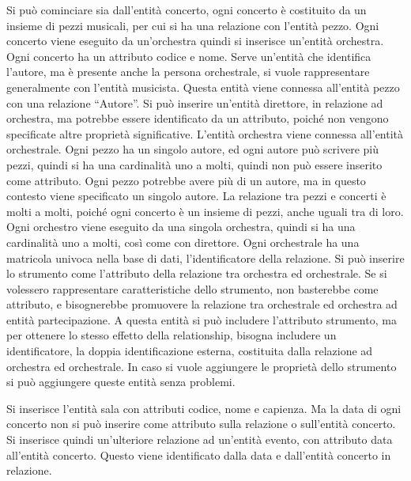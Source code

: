 \documentclass{article}
\numberwithin{equation}{subsection}
\begin{document}
Si può cominciare sia dall'entità concerto, ogni concerto è costituito da un insieme di pezzi musicali, per cui si ha una relazione con l'entità 
pezzo. Ogni concerto viene eseguito da un'orchestra quindi si inserisce un'entità orchestra. Ogni concerto ha un attributo codice e nome. 
Serve un'entità che identifica l'autore, ma è presente anche la persona orchestrale, si vuole rappresentare generalmente con l'entità musicista. Questa entità viene 
connessa all'entità pezzo con una relazione ``Autore''. Si può inserire un'entità direttore, in relazione ad orchestra, ma potrebbe essere 
identificato da un attributo, poiché non vengono specificate altre proprietà significative. L'entità orchestra viene connessa all'entità orchestrale. 
Ogni pezzo ha un singolo autore, ed ogni autore può scrivere più pezzi, quindi si ha una cardinalità uno a molti, quindi non può essere 
inserito come attributo. Ogni pezzo potrebbe avere più di un autore, ma in questo contesto viene specificato un singolo autore. La relazione tra 
pezzi e concerti è molti a molti, poiché ogni concerto è un insieme di pezzi, anche uguali tra di loro. 
Ogni orchestro viene eseguito da una singola orchestra, quindi si ha una cardinalità uno a molti, così come con direttore. 
Ogni orchestrale ha una matricola univoca nella base di dati, l'identificatore della relazione. Si può inserire lo strumento come l'attributo della 
relazione tra orchestra ed orchestrale. Se si volessero rappresentare caratteristiche dello strumento, non basterebbe come attributo, e 
bisognerebbe promuovere la relazione tra orchestrale ed orchestra ad entità partecipazione. A questa entità si può includere l'attributo 
strumento, ma per ottenere lo stesso effetto della relationship, bisogna includere un identificatore, la doppia identificazione esterna, costituita 
dalla relazione ad orchestra ed orchestrale. In caso si vuole aggiungere le proprietà dello strumento si può aggiungere queste entità senza problemi. 

Si inserisce l'entità sala con attributi codice, nome e capienza. Ma la data di ogni concerto non si può inserire come attributo sulla relazione o 
sull'entità concerto. Si inserisce quindi un'ulteriore relazione ad un'entità evento, con attributo data all'entità concerto. Questo viene identificato 
dalla data e dall'entità concerto in relazione. 
\end{document}
